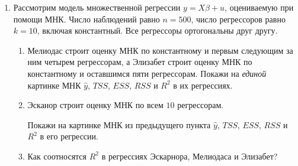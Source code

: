 \documentclass[12pt]{article}
\begin{document}
\begin{enumerate}
\item 

Рассмотрим модель множественной регрессии $y = X\beta + u$, оцениваемую при помощи МНК. 
Число наблюдений равно $n=500$, число регрессоров равно $k=10$, включая константный.
Все регрессоры ортогональны друг другу.
\begin{enumerate}
	\item Мелиодас строит оценку МНК по константному и первым следующим за ним четырем регрессорам, 
	а Элизабет строит оценку МНК по константному и оставшимся пяти регрессорам. 
	Покажи на \textit{единой} картинке МНК $\hat{y}$, $TSS$, $ESS$, $RSS$ и $R^2$ в их регрессиях.

	\item Эсканор строит оценку МНК по всем $10$ регрессорам. 

	Покажи на картинке МНК из предыдущего пункта $\hat{y}$, $TSS$, $ESS$, $RSS$ и $R^2$ в его регрессии.

	\item Как соотносятся $R^2$ в регрессиях Эскарнора, Мелиодаса и Элизабет? 
\end{enumerate}


\end{enumerate}
\end{document}
